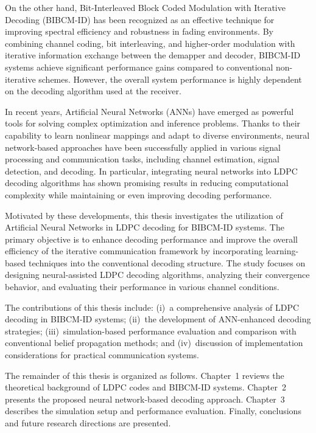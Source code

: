 \documentclass[a4paper,14pt]{extreport}
\begin{document}
On the other hand, Bit-Interleaved Block Coded Modulation with Iterative Decoding (BIBCM-ID) has been recognized as an effective technique for improving spectral efficiency and robustness in fading environments. By combining channel coding, bit interleaving, and higher-order modulation with iterative information exchange between the demapper and decoder, BIBCM-ID systems achieve significant performance gains compared to conventional non-iterative schemes. However, the overall system performance is highly dependent on the decoding algorithm used at the receiver.

In recent years, Artificial Neural Networks (ANNs) have emerged as powerful tools for solving complex optimization and inference problems. Thanks to their capability to learn nonlinear mappings and adapt to diverse environments, neural network-based approaches have been successfully applied in various signal processing and communication tasks, including channel estimation, signal detection, and decoding. In particular, integrating neural networks into LDPC decoding algorithms has shown promising results in reducing computational complexity while maintaining or even improving decoding performance.

Motivated by these developments, this thesis investigates the utilization of Artificial Neural Networks in LDPC decoding for BIBCM-ID systems. The primary objective is to enhance decoding performance and improve the overall efficiency of the iterative communication framework by incorporating learning-based techniques into the conventional decoding structure. The study focuses on designing neural-assisted LDPC decoding algorithms, analyzing their convergence behavior, and evaluating their performance in various channel conditions.

The contributions of this thesis include: (i)~a comprehensive analysis of LDPC decoding in BIBCM-ID systems; (ii)~the development of ANN-enhanced decoding strategies; (iii)~simulation-based performance evaluation and comparison with conventional belief propagation methods; and (iv)~discussion of implementation considerations for practical communication systems.

The remainder of this thesis is organized as follows. Chapter~1 reviews the theoretical background of LDPC codes and BIBCM-ID systems. Chapter~2 presents the proposed neural network-based decoding approach. Chapter~3 describes the simulation setup and performance evaluation. Finally, conclusions and future research directions are presented.
\end{document}
